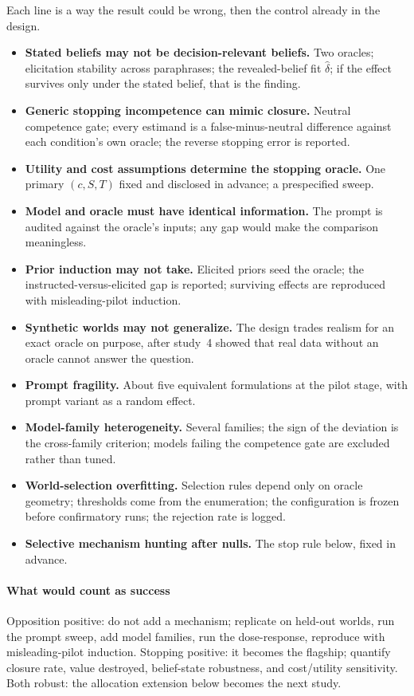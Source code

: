 \documentclass[10pt,letterpaper,twocolumn]{article}
\begin{document}
Each line is a way the result could be wrong, then the control already in the design.
\begin{itemize}
\item \textbf{Stated beliefs may not be decision-relevant beliefs.} Two oracles; elicitation stability across paraphrases; the revealed-belief fit $\hat\delta$; if the effect survives only under the stated belief, that is the finding.
\item \textbf{Generic stopping incompetence can mimic closure.} Neutral competence gate; every estimand is a false-minus-neutral difference against each condition's own oracle; the reverse stopping error is reported.
\item \textbf{Utility and cost assumptions determine the stopping oracle.} One primary $(c,S,T)$ fixed and disclosed in advance; a prespecified sweep.
\item \textbf{Model and oracle must have identical information.} The prompt is audited against the oracle's inputs; any gap would make the comparison meaningless.
\item \textbf{Prior induction may not take.} Elicited priors seed the oracle; the instructed-versus-elicited gap is reported; surviving effects are reproduced with misleading-pilot induction.
\item \textbf{Synthetic worlds may not generalize.} The design trades realism for an exact oracle on purpose, after study~4 showed that real data without an oracle cannot answer the question.
\item \textbf{Prompt fragility.} About five equivalent formulations at the pilot stage, with prompt variant as a random effect.
\item \textbf{Model-family heterogeneity.} Several families; the sign of the deviation is the cross-family criterion; models failing the competence gate are excluded rather than tuned.
\item \textbf{World-selection overfitting.} Selection rules depend only on oracle geometry; thresholds come from the enumeration; the configuration is frozen before confirmatory runs; the rejection rate is logged.
\item \textbf{Selective mechanism hunting after nulls.} The stop rule below, fixed in advance.
\end{itemize}

\paragraph{What would count as success}
Opposition positive: do not add a mechanism; replicate on held-out worlds, run the prompt sweep, add model families, run the dose-response, reproduce with misleading-pilot induction. Stopping positive: it becomes the flagship; quantify closure rate, value destroyed, belief-state robustness, and cost/utility sensitivity. Both robust: the allocation extension below becomes the next study.
\end{document}
